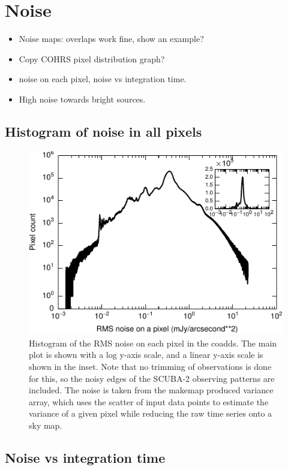 \documentclass[twocolumn]{aastex6}
\begin{document}
\section{Noise}

\begin{itemize}
\item Noise maps: overlaps work fine, show an example? 
\item Copy COHRS pixel distribution graph?
\item noise on each pixel, noise vs integration time.
\item High noise towards bright sources.
\end{itemize}

\subsection{Histogram of noise in all pixels}
\begin{figure}
  \centering
  \includegraphics{coadds-noise-histogram.pdf}
  \caption{Histogram of the RMS noise on each pixel in the coadds. The
    main plot is shown with a log y-axis scale, and a linear y-axis
    scale is shown in the inset. Note that no trimming of observations
    is done for this, so the noisy edges of the SCUBA-2 observing
    patterns are included. The noise is taken from the makemap
    produced variance array, which uses the scatter of input data
    points to estimate the variance of a given pixel while reducing
    the raw time series onto a sky map.}
  \label{fig:histonoise}
\end{figure}
\subsection{Noise vs integration time}
\end{document}
